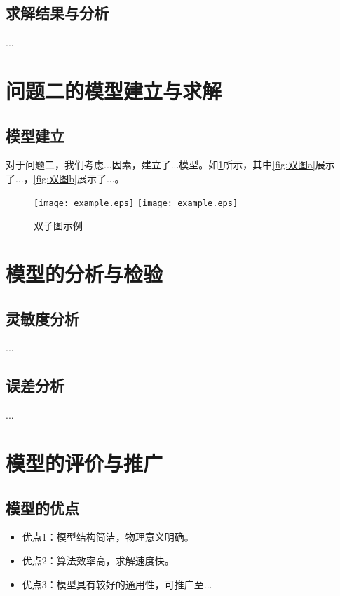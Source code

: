 \documentclass[withoutpreface,notoc]{cumcmthesis}
\begin{document}
	\subsection{求解结果与分析}
	...
	
	\section{问题二的模型建立与求解}
	\subsection{模型建立}
	对于问题二，我们考虑...因素，建立了...模型。如\cref{fig:双图}所示，其中\cref{fig:双图a}展示了...，\cref{fig:双图b}展示了...。
	
	\begin{figure}[ht]
		\centering
		{\texttt{[image: example.eps]}}
		\hfill %
		{\texttt{[image: example.eps]}}
		\caption{双子图示例}
		\label{fig:双图}
	\end{figure}
	
	\section{模型的分析与检验}
	\subsection{灵敏度分析}
	...
	\subsection{误差分析}
	...
	\section{模型的评价与推广}
	\subsection{模型的优点}
	\begin{itemize}[itemindent=2em]
		\item 优点1：模型结构简洁，物理意义明确。
		\item 优点2：算法效率高，求解速度快。
		\item 优点3：模型具有较好的通用性，可推广至...
	\end{itemize}
\end{document}
